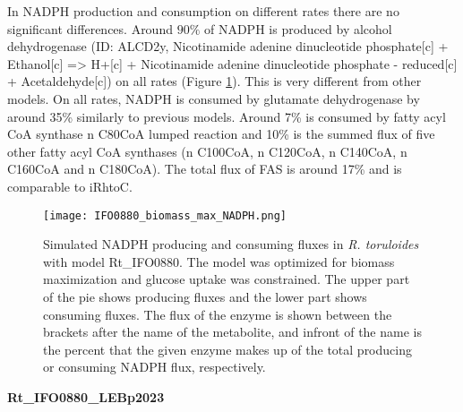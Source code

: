 In NADPH production and consumption on different rates there are no significant differences. Around $90\%$ of NADPH is produced by alcohol dehydrogenase (ID: ALCD2y, Nicotinamide adenine dinucleotide phosphate[c] + Ethanol[c] => H+[c] + Nicotinamide adenine dinucleotide phosphate - reduced[c] + Acetaldehyde[c]) on all rates (Figure \ref{fig:IFO0880_biomass_max_NADPH_max}). This is very different from other models. 
On all rates, NADPH is consumed by glutamate dehydrogenase by around 35\% similarly to previous models. Around 7\% is consumed by fatty acyl CoA synthase n C80CoA lumped reaction and 10\% is the summed flux of five other fatty acyl CoA synthases (n C100CoA, n C120CoA, n C140CoA, n C160CoA and n C180CoA). The total flux of FAS is around 17\% and is comparable to iRhtoC.
\begin{figure}[H]
    \centering
    \texttt{[image: IFO0880\_biomass\_max\_NADPH.png]}
    \caption{Simulated NADPH producing and consuming fluxes in \textit{R. toruloides} with model Rt\_IFO0880. The model was optimized for biomass maximization 
    and glucose uptake was constrained. The upper part of the pie shows producing fluxes and the lower part shows consuming fluxes.
    The flux of the enzyme is shown between the brackets after the name of the metabolite, and infront of the name is the percent
    that the given enzyme makes up of the total producing or consuming NADPH flux, respectively.}
    \label{fig:IFO0880_biomass_max_NADPH_max}
\end{figure}



\textbf{Rt\_IFO0880\_LEBp2023}

